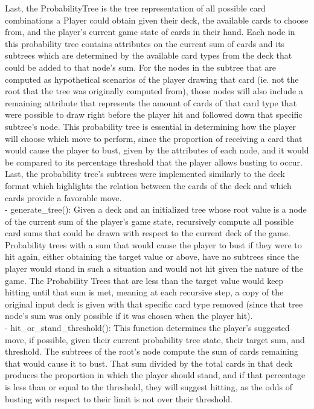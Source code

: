 \documentclass[fontsize=11pt]{article}
\begin{document}
Last, the ProbabilityTree is the tree representation of all possible card combinations a Player could obtain given their deck, the available cards to choose from, and the player’s current game state of cards in their hand. Each node in this probability tree contains attributes on the current sum of cards and its subtrees which are determined by the available card types from the deck that could be added to that node’s sum. For the nodes in the subtree that are computed as hypothetical scenarios of the player drawing that card (ie. not the root that the tree was originally computed from), those nodes will also include a remaining attribute that represents the amount of cards of that card type that were possible to draw right before the player hit and followed down that specific subtree’s node. This probability tree is essential in determining how the player will choose which move to perform, since the proportion of receiving a card that would cause the player to bust, given by the attributes of each node, and it would be compared to its percentage threshold that the player allows busting to occur. Last, the probability tree’s subtrees were implemented similarly to the deck format which highlights the relation between the cards of the deck and which cards provide a favorable move.
\\
- generate\_tree(): Given a deck and an initialized tree whose root value is a node of the current sum of the player’s game state, recursively compute all possible card sums that could be drawn with respect to the current deck of the game. Probability trees with a sum that would cause the player to bust if they were to hit again, either obtaining the target value or above, have no subtrees since the player would stand in such a situation and would not hit given the nature of the game. The Probability Trees that are less than the target value would keep hitting until that sum is met, meaning at each recursive step, a copy of the original input deck is given with that specific card type removed (since that tree node’s sum was only possible if it was chosen when the player hit).
\\
- hit\_or\_stand\_threshold(): This function determines the player’s suggested move, if possible, given their current probability tree state, their target sum, and threshold. The subtrees of the root’s node compute the sum of cards remaining that would cause it to bust. That sum divided by the total cards in that deck produces the proportion in which the player should stand, and if that percentage is less than or equal to the threshold, they will suggest hitting, as the odds of busting with respect to their limit is not over their threshold.
\end{document}
